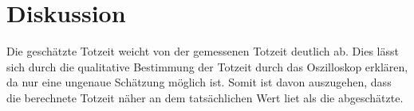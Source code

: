 \section{Diskussion}
\label{sec:Diskussion}

Die geschätzte Totzeit weicht von der gemessenen Totzeit deutlich ab. Dies lässt sich durch die qualitative
Bestimmung der Totzeit durch das Oszilloskop erklären, da nur eine ungenaue Schätzung möglich ist. Somit ist
davon auszugehen, dass die berechnete Totzeit näher an dem tatsächlichen Wert liet als die abgeschätzte.
